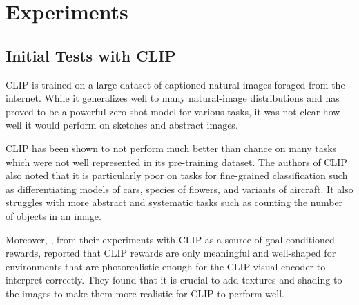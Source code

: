 \chapter{Experiments}
\label{sec:experiments}


\section{Initial Tests with CLIP}
\label{sec:clip-custom}

CLIP is trained on a large dataset of captioned natural images foraged from the internet.
While it generalizes well to many natural-image distributions and has proved to be a powerful zero-shot model for various tasks, it was not clear how well it would perform on sketches and abstract images. 

CLIP has been shown to not perform much better than chance on many tasks which were not well represented in its pre-training dataset.
The authors of CLIP also noted that it is particularly poor on tasks for fine-grained classification such as differentiating models of cars, species of flowers, and variants of aircraft.
It also struggles with more abstract and systematic tasks such as counting the number of objects in an image.

Moreover, \cite{vlmrm}, from their experiments with CLIP as a source of goal-conditioned rewards, reported that CLIP rewards are only meaningful and well-shaped for environments that are photorealistic enough for the CLIP visual encoder to interpret correctly.
They found that it is crucial to add textures and shading to the images to make them more realistic for CLIP to perform well.

